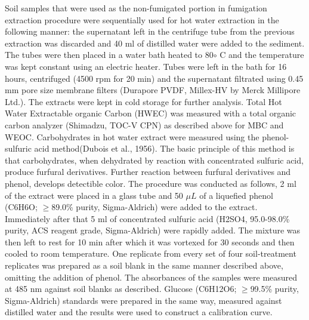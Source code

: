     	Soil samples that were used as the non-fumigated portion in fumigation extraction procedure were sequentially used for hot water extraction in the following manner: the supernatant left in the centrifuge tube from the previous extraction was discarded and 40 ml of distilled water were added to the sediment. The tubes were then placed in a water bath heated to 80$\circ$ C and the temperature was kept constant using an electric heater. Tubes were left in the bath for 16 hours, centrifuged (4500 rpm for 20 min) and the supernatant filtrated using 0.45 mm pore size membrane filters (Durapore PVDF, Millex-HV by Merck Millipore Ltd.). The extracts were kept in cold storage for further analysis.
    	Total Hot Water Extractable organic Carbon (HWEC) was measured with a  total organic carbon analyzer (Shimadzu, TOC-V CPN) as described above for MBC and WEOC.
    	Carbohydrates in hot water extract were measured using the phenol-sulfuric acid method(Dubois et al., 1956). The basic principle of this method is that carbohydrates, when dehydrated by reaction with concentrated sulfuric acid, produce furfural derivatives. Further reaction between furfural derivatives and phenol, develops detectible color. The procedure was conducted as follows, 2 ml of the extract were placed in a glass tube and 50 $ \mu L $ of a liquefied phenol (C6H6O; $ \geq $89.0\% purity, Sigma-Aldrich) were added to the extract. Immediately after that 5 ml of concentrated sulfuric acid (H2SO4, 95.0-98.0\% purity, ACS reagent grade, Sigma-Aldrich) were rapidly added. The mixture was then left to rest for 10 min after which it was vortexed for 30 seconds and then cooled to room temperature. One replicate from every set of four soil-treatment replicates was prepared as a soil blank in the same manner described above, omitting the addition of phenol. The absorbances of the samples were measured at 485 nm against soil blanks as described. Glucose (C6H12O6; $ \geq $99.5\% purity, Sigma-Aldrich) standards were prepared in the same way, measured against distilled water and the results were used to construct a calibration curve.


